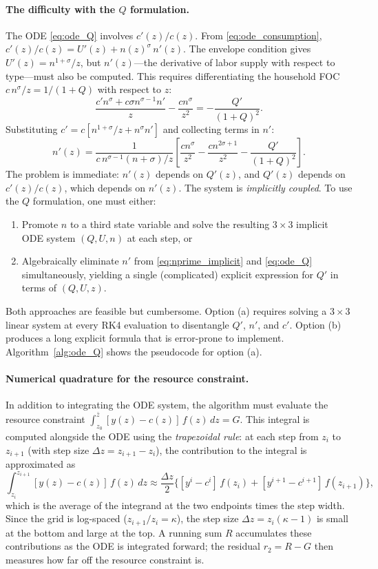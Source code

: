 \documentclass[12pt,a4paper]{article}
\theoremstyle{definition}
\theoremstyle{plain}
\theoremstyle{remark}
\newcommand{\zbar}{\bar{z}}
\newcommand{\zlow}{z_{\scriptscriptstyle 0}}
\begin{document}
\paragraph{The difficulty with the $Q$ formulation.}
The ODE \eqref{eq:ode_Q} involves $c'(z)/c(z)$. From \eqref{eq:ode_consumption}, $c'(z)/c(z) = U'(z) + n(z)^{\sigma}\,n'(z)$. The envelope condition gives $U'(z) = n^{1+\sigma}/z$, but $n'(z)$---the derivative of labor supply with respect to type---must also be computed. This requires differentiating the household FOC $c\,n^{\sigma}/z = 1/(1+Q)$ with respect to $z$:
\[
  \frac{c'n^{\sigma} + c\sigma n^{\sigma-1}n'}{z} - \frac{cn^{\sigma}}{z^2} = -\frac{Q'}{(1+Q)^2}.
\]
Substituting $c' = c[n^{1+\sigma}/z + n^{\sigma}n']$ and collecting terms in $n'$:
\begin{equation}
\label{eq:nprime_implicit}
  n'(z) = \frac{1}{c\,n^{\sigma-1}(n+\sigma)/z}\left[\frac{cn^{\sigma}}{z^2} - \frac{cn^{2\sigma+1}}{z^2} - \frac{Q'}{(1+Q)^2}\right].
\end{equation}
The problem is immediate: $n'(z)$ depends on $Q'(z)$, and $Q'(z)$ depends on $c'(z)/c(z)$, which depends on $n'(z)$. The system is \emph{implicitly coupled}. To use the $Q$ formulation, one must either:
\begin{enumerate}[label=(\alph*)]
  \item Promote $n$ to a third state variable and solve the resulting $3 \times 3$ implicit ODE system $(Q, U, n)$ at each step, or
  \item Algebraically eliminate $n'$ from \eqref{eq:nprime_implicit} and \eqref{eq:ode_Q} simultaneously, yielding a single (complicated) explicit expression for $Q'$ in terms of $(Q, U, z)$.
\end{enumerate}
Both approaches are feasible but cumbersome. Option (a) requires solving a $3 \times 3$ linear system at every RK4 evaluation to disentangle $Q'$, $n'$, and $c'$. Option (b) produces a long explicit formula that is error-prone to implement. Algorithm~\ref{alg:ode_Q} shows the pseudocode for option (a).

\paragraph{Numerical quadrature for the resource constraint.}
In addition to integrating the ODE system, the algorithm must evaluate the resource constraint $\int_{\zlow}^{\zbar}[y(z) - c(z)]\,f(z)\,dz = G$. This integral is computed alongside the ODE using the \emph{trapezoidal rule}: at each step from $z_i$ to $z_{i+1}$ (with step size $\Delta z = z_{i+1} - z_i$), the contribution to the integral is approximated as
\[
  \int_{z_i}^{z_{i+1}} [y(z) - c(z)]\,f(z)\,dz \approx \frac{\Delta z}{2}\bigl\{[y^i - c^i]\,f(z_i) + [y^{i+1} - c^{i+1}]\,f(z_{i+1})\bigr\},
\]
which is the average of the integrand at the two endpoints times the step width. Since the grid is log-spaced ($z_{i+1}/z_i = \kappa$), the step size $\Delta z = z_i(\kappa - 1)$ is small at the bottom and large at the top. A running sum $R$ accumulates these contributions as the ODE is integrated forward; the residual $r_2 = R - G$ then measures how far off the resource constraint is.
\end{document}

